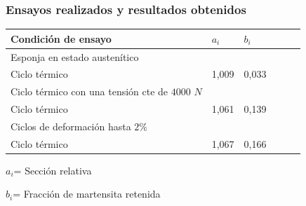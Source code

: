 \documentclass[usenames,dvipsnames]{beamer}
\begin{document}
\begin{frame}

% 

\frametitle{Ensayos realizados y resultados obtenidos}


% 
% 
\begin{small}

\begin{tabular}{@{}llllll@{}} \toprule
Condición de ensayo & $a_i$&  $b_i$\\ \midrule
Esponja en estado austenítico   &&\\
Ciclo térmico  & 1,009  & 0,033\\
Ciclo térmico con una tensión cte de $4000$ $N$  &&\\
Ciclo térmico &  1,061   & 0,139 \\
Ciclos de deformación hasta $2\%$ &&\\
Ciclo térmico  &  1,067  & 0,166  \\
 \bottomrule
\end{tabular}
\end{small}

$a_i$= Sección relativa

$b_i$= Fracción de martensita retenida

\end{frame}
\end{document}
